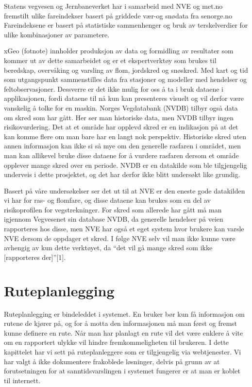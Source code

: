 \documentclass[a4paper,norsk,oneside]{book}
\begin{document}
Statens vegvesen og Jernbaneverket har i samarbeid med NVE og met.no fremstilt ulike fareindekser basert på griddede vær-og snødata fra senorge.no
Fareindeksene er basert på statistiske sammenhenger og bruk av terskelverdier for ulike kombinasjoner av parametere. 

xGeo (fotnote) innholder produksjon av data og formidling av resultater som kommer ut av dette samarbeidet og er et ekspertverktøy som brukes til beredskap, overvåking og varsling av flom, jordskred og snøskred. Med kart og tid som utgangspunkt sammenstilles data fra stasjoner og modeller med hendelser og feltobservasjoner. Dessverre er det ikke mulig for oss å ta i bruk dataene i applikasjonen, fordi dataene til nå kun kan presenteres visuelt og vil derfor være vanskelig å tolke for en maskin.
	Norges Vegdatabank (NVDB) tilbyr også data om skred som har gått. Her ser man historiske data, men NVDB tilbyr ingen risikovurdering. Det at et område har opplevd skred er en indikasjon på at det kan komme flere om man bare har en langt nok perspektiv.  Historiske skred uten annen informasjon kan ikke si så mye om den generelle rasfaren i området, men man kan allikevel bruke disse dataene for å vurdere rasfaren dersom et område opplever mange skred over en periode. NVDB er en datakilde som ble tilgjengelig underveis i dette prosjektet, og det har derfor ikke blitt undersøkt like grundig.

Basert på våre undersøkelser ser det ut til at NVE er den eneste gode datakilden vi har for ras- og flomfare, og disse dataene kan brukes som en del av risikoprofilen for vegstrekninger. For skred som allerede har gått må man igjennom Vegvesenet sin database NVDB, da generelle hendelser på veien rapporteres hos disse, men NVE har også et eget system hvor brukere kan varsle NVE dersom de oppdager et skred. I følge NVE selv vil man ikke kunne være avhengig av kun dette verktøyet, da “det vil gå mange skred som ikke [rapporteres der]”[1].

\section{Ruteplanlegging}
Ruteplanlegging er bindeleddet i systemet. En bruker bør kun få informasjon om rutene de kjører på, og for å motta den informasjonen må man først og fremst kunne definere en rute. Når man har planlagt en rute vil det være enklere å vite om en rapportert ulykke vil hindre fremkommeligheten til brukeren. I dette kapittelet har vi sett på ruteplanleggere som er tilgjengelig via webtjenester. Vi har valgt å ikke dokumentere frakoblede løsninger, delvis på grunn av at forutsetningen for at sanntidsvarslingen i systemet fungerer er at man er koblet til internett.
\end{document}
